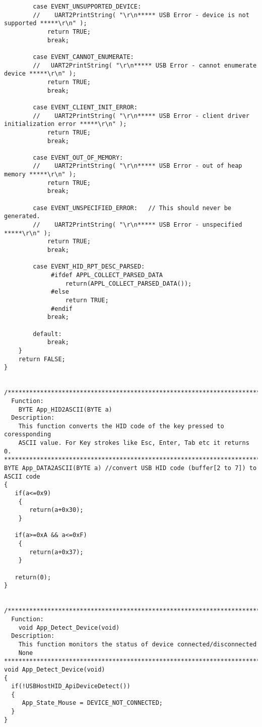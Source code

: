 \documentclass{article}
\begin{document}
\begin{verbatim}
        case EVENT_UNSUPPORTED_DEVICE:
        //    UART2PrintString( "\r\n***** USB Error - device is not supported *****\r\n" );
            return TRUE;
            break;

        case EVENT_CANNOT_ENUMERATE:
        //   UART2PrintString( "\r\n***** USB Error - cannot enumerate device *****\r\n" );
            return TRUE;
            break;

        case EVENT_CLIENT_INIT_ERROR:
        //    UART2PrintString( "\r\n***** USB Error - client driver initialization error *****\r\n" );
            return TRUE;
            break;

        case EVENT_OUT_OF_MEMORY:
        //    UART2PrintString( "\r\n***** USB Error - out of heap memory *****\r\n" );
            return TRUE;
            break;

        case EVENT_UNSPECIFIED_ERROR:   // This should never be generated.
        //    UART2PrintString( "\r\n***** USB Error - unspecified *****\r\n" );
            return TRUE;
            break;

		case EVENT_HID_RPT_DESC_PARSED:
			 #ifdef APPL_COLLECT_PARSED_DATA
			     return(APPL_COLLECT_PARSED_DATA());
		     #else
				 return TRUE;
			 #endif
			break;

        default:
            break;
    }
    return FALSE;
}


/****************************************************************************
  Function:
    BYTE App_HID2ASCII(BYTE a)
  Description:
    This function converts the HID code of the key pressed to coressponding
    ASCII value. For Key strokes like Esc, Enter, Tab etc it returns 0.
***************************************************************************/
BYTE App_DATA2ASCII(BYTE a) //convert USB HID code (buffer[2 to 7]) to ASCII code
{
   if(a<=0x9)
    {
       return(a+0x30);
    }

   if(a>=0xA && a<=0xF) 
    {
       return(a+0x37);
    }

   return(0);
}


/****************************************************************************
  Function:
    void App_Detect_Device(void)
  Description:
    This function monitors the status of device connected/disconnected
    None
***************************************************************************/
void App_Detect_Device(void)
{
  if(!USBHostHID_ApiDeviceDetect())
  {
     App_State_Mouse = DEVICE_NOT_CONNECTED;
  }
}



\end{verbatim}
\end{document}
